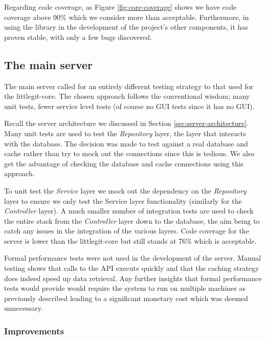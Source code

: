 Regarding code coverage, as Figure \ref{fig:core-coverage} shows we have code coverage above 90\% which we consider more than acceptable. Furthermore, in using the library in the development of the project's other components, it has proven stable, with only a few bugs discovered.


\subsection{The main server}

The main server called for an entirely different testing strategy to that used for the littlegit-core. The chosen approach follows the conventional wisdom; many unit tests, fewer service level tests (of course no GUI tests since it has no GUI).

Recall the server architecture we discussed in Section \ref{sec:server-architecture}. Many unit tests are used to test the \emph{Repository} layer, the layer that interacts with the database. The decision was made to test against a real database and cache rather than try to mock out the connections since this is tedious. We also get the advantage of checking the database and cache connections using this approach.

To unit test the \emph{Service} layer we mock out the dependency on the \emph{Repository} layer to ensure we only test the Service layer functionality (similarly for the \emph{Controller} layer).  A much smaller number of integration tests are used to check the entire stack from the \emph{Controller} layer down to the database, the aim being to catch any issues in the integration of the various layers. Code coverage for the server is lower than the littlegit-core but still stands at 76\% which is acceptable.

Formal performance tests were not used in the development of the server. Manual testing shows that calls to the API execute quickly and that the caching strategy does indeed speed up data retrieval. Any further insights that formal performance tests would provide would require the system to run on multiple machines as previously described leading to a significant monetary cost which was deemed unnecessary.

\subsubsection{Improvements}

